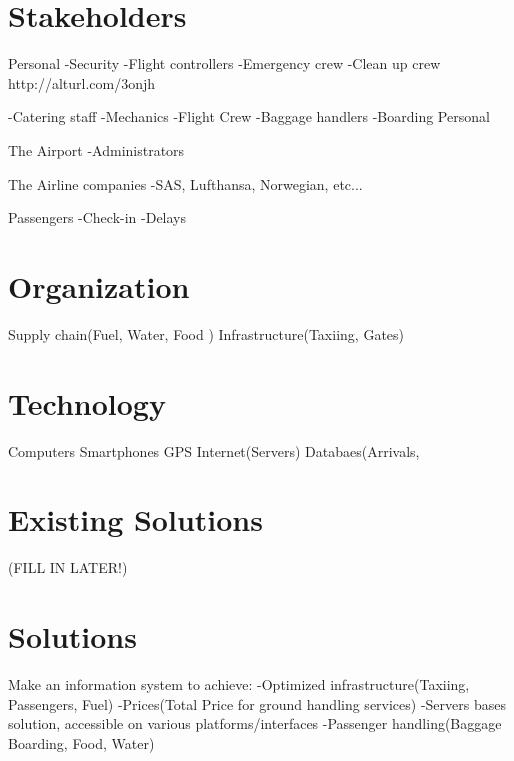 \section{Stakeholders} 
\label{Stakeholders}

Personal
	-Security
	-Flight controllers
	-Emergency crew
	-Clean up crew
	http://alturl.com/3onjh
	
	-Catering staff
	-Mechanics
	-Flight Crew
	-Baggage handlers
	-Boarding Personal
	
The Airport
	-Administrators

The Airline companies
	-SAS, Lufthansa, Norwegian, etc...
	
Passengers
	-Check-in
	-Delays
		
\section{Organization}
\label{Organization}
Supply chain(Fuel, Water, Food )	
Infrastructure(Taxiing, Gates)

	
\section{Technology}
\label{Technology}
Computers
Smartphones
GPS
Internet(Servers)
Databaes(Arrivals, 

\section{Existing Solutions}
\label{Existing Solutions}
(FILL IN LATER!)

\section{Solutions}
\label{Solutons}
Make an information system to achieve:
	-Optimized infrastructure(Taxiing, Passengers, Fuel)
	-Prices(Total Price for ground handling services)
	-Servers bases solution, accessible on various platforms/interfaces
	-Passenger handling(Baggage Boarding, Food, Water)